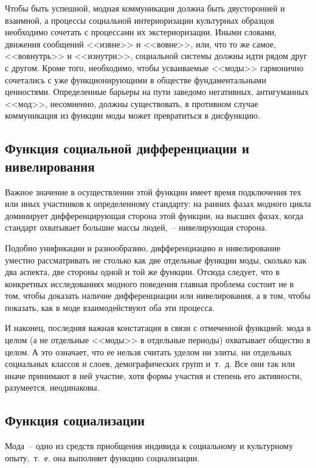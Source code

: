   Чтобы быть успешной, модная коммуникация должна быть двусторонней и взаимной,
  а процессы социальной интериоризации культурных образцов необходимо сочетать с
  процессами их экстериоризации. Иными словами, движения сообщений <<извне>> и
  <<вовне>>, или, что то же самое, <<вовнутрь>> и <<изнутри>>, социальной
  системы должны идти рядом друг с другом. Кроме того, необходимо, чтобы
  усваиваемые <<моды>> гармонично сочетались с уже функционирующими в обществе
  фундаментальными ценностями. Определенные барьеры на пути заведомо негативных,
  антигуманных <<мод>>, несомненно, должны существовать, в противном случае
  коммуникация из функции моды может превратиться в дисфункцию.
  
  \subsection{Функция социальной дифференциации и нивелирования}
  
  Важное значение в осуществлении этой функции имеет время подключения тех или
  иных участников к определенному стандарту: на ранних фазах модного цикла
  доминирует дифференцирующая сторона этой функции, на высших фазах, когда
  стандарт охватывает большие массы людей,~-- нивелирующая сторона.
  
  Подобно унификации и разнообразию, дифференциацию и нивелирование уместно
  рассматривать не столько как две отдельные функции моды, сколько как два
  аспекта, две стороны одной и той же функции. Отсюда следует, что в конкретных
  исследованиях модного поведения главная проблема состоит не в том, чтобы
  доказать наличие дифференциации или нивелирования, а в том, чтобы показать,
  как в моде взаимодействуют оба эти процесса.
  
  И наконец, последняя важная констатация в связи с отмеченной функцией: мода в
  целом (а не отдельные <<моды>> в отдельные периоды) охватывает общество в
  целом. А это означает, что ее нельзя считать уделом ни элиты, ни отдельных
  социальных классов и слоев, демографических групп и~т.~д. Все они так или
  иначе принимают в ней участие, хотя формы участия и степень его активности,
  разумеется, неодинаковы.
  
  \subsection{Функция социализации}
  
  Мода~-- одно из средств приобщения индивида к социальному и культурному
  опыту,~т.~е. она выполняет функцию социализации.
  
